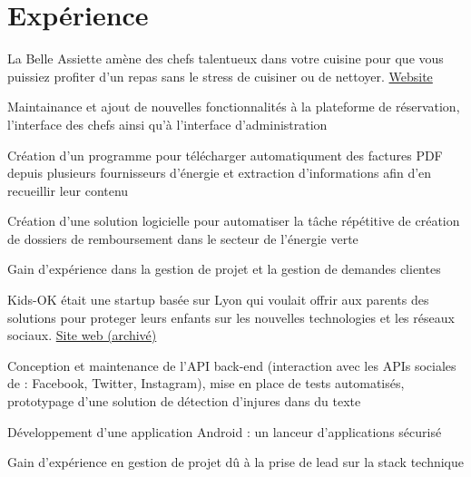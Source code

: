 \documentclass[]{resume-openfont}
\begin{document}
\begin{minipage}[t]{0.66\textwidth}


\section{Expérience}
%
%
La Belle Assiette amène des chefs talentueux dans votre cuisine pour que vous puissiez profiter d'un repas sans le stress de cuisiner ou de nettoyer. \href{https://labelleassiette.co.uk}{Website}
\vspace{1.5\topsep} %
\begin{tightemize}
\item Maintainance et ajout de nouvelles fonctionnalités à la plateforme de réservation, l'interface des chefs ainsi qu'à l'interface d'administration
\end{tightemize}
\sectionsep

%
%
\vspace{1.5\topsep} %
\begin{tightemize}
\item Création d'un programme pour télécharger automatiqument des factures PDF depuis plusieurs fournisseurs d'énergie et extraction d'informations afin d'en recueillir leur contenu
\item Création d'une solution logicielle pour automatiser la tâche répétitive de création de dossiers de remboursement dans le secteur de l'énergie verte
\item Gain d'expérience dans la gestion de projet et la gestion de demandes clientes
\end{tightemize}
\sectionsep

%
%
Kids-OK était une startup basée sur Lyon qui voulait offrir aux parents des solutions pour proteger leurs enfants sur les nouvelles technologies et les réseaux sociaux. \href{https://i.imgur.com/ZAXWuZN.png}{Site web (archivé)}
\vspace{\topsep}
\begin{tightemize}
\item Conception et maintenance de l'API back-end (interaction avec les APIs sociales de : Facebook, Twitter, Instagram), mise en place de tests automatisés, prototypage d'une solution de détection d'injures dans du texte
\item Développement d'une application Android : un lanceur d'applications sécurisé
\item Gain d'expérience en gestion de projet dû à la prise de lead sur la stack technique
\end{tightemize}
\sectionsep


\end{minipage}
\end{document}
